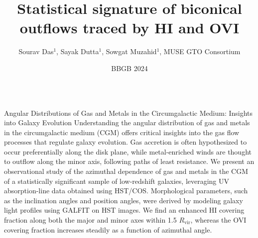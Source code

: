 \documentclass{beamer}
\title[SBS\,0335-052E]{Statistical signature of biconical outflows traced by HI and OVI}
\author{Sourav Das$^1$, Sayak Dutta$^1$, Sowgat Muzahid$^1$, MUSE GTO Consortium}
\institute[]{$^1$Inter-University Centre for Astronomy \& Astrophysics, Post Bag 04, Pune, India 411007}
\date{BBGB 2024}
\begin{document}
\begin{frame}
  \begin{columns}[c]
    \begin{column}{0.99\textwidth} \vspace{+0.3em}
      \begin{block}{Angular Distributions of Gas and Metals in the Circumgalactic       Medium: Insights into Galaxy Evolution}
        \large Understanding the angular distribution of gas and metals in the circumgalactic medium (CGM) offers critical insights into the gas flow processes that regulate galaxy evolution. Gas accretion is often hypothesized to occur preferentially along the disk plane, while metal-enriched winds are thought to outflow along the minor axis, following paths of least resistance. We present an observational study of the azimuthal dependence of gas and metals in the CGM of a statistically significant sample of low-redshift galaxies, leveraging UV absorption-line data obtained using HST/COS. Morphological parameters, such as the inclination angles and position angles, were derived by modeling galaxy light profiles using GALFIT on HST images. We find an enhanced HI covering fraction along both the major and minor axes within 1.5 $R_{\text{vir}}$, whereas the OVI covering fraction increases steadily as a function of azimuthal angle.
        \end{block}
    \end{column}

\end{columns}
\end{frame}
\end{document}
